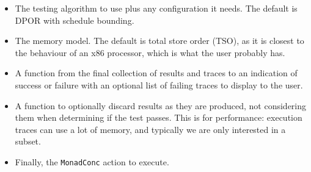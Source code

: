 \begin{itemize}
\item The testing algorithm to use plus any configuration it needs.
  The default is DPOR with schedule bounding.
\item The memory model.  The default is total store order (TSO), as it
  is closest to the behaviour of an x86 processor\cite{owens2009},
  which is what the user probably has.
\item A function from the final collection of results and traces to an
  indication of success or failure with an optional list of failing
  traces to display to the user.
\item A function to optionally discard results as they are produced,
  not considering them when determining if the test passes.  This is
  for performance: execution traces can use a lot of memory, and
  typically we are only interested in a subset.
\item Finally, the \verb|MonadConc| action to execute.
\end{itemize}

